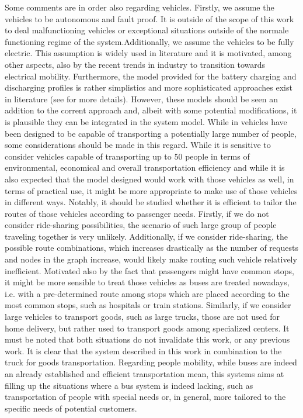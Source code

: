 Some comments are in order also regarding vehicles. Firstly, we assume the vehicles to be autonomous and fault proof. It is outside of the scope of this work to deal malfunctioning vehicles or exceptional situations outside of the normale functioning regime of the system.Additionally, we assume the vehicles to be fully electric. This assumption is widely used in literature and it is motivated, among other aspects, also by the recent trends in industry to transition towards electrical mobility. Furthermore, the model provided for the battery charging and discharging profiles is rather simplistics and more sophisticated approaches exist in literature (see  for more details). However, these models should be seen an addition to the corrent approach and, albeit with some potential modifications, it is plausible they can be integrated in the system model. While in \cite{project_thesis} vehicles have been designed to be capable of transporting a potentially large number of people, some considerations should be made in this regard. While it is sensitive to consider vehicles capable of transporting up to 50 people in terms of environmental, economical and overall transportation efficiency and while it is also expected that the model designed would work with those vehicles as well, in terms of practical use, it might be more appropriate to make use of those vehicles in different ways. Notably, it should be studied whether it is efficient to tailor the routes of those vehicles according to passenger needs. Firstly, if we do not consider ride-sharing possibilities, the scenario of such large group of people traveling together is very unlikely. Additionally, if we consider ride-sharing, the possible route combinations, which increases drastically as the number of requests and nodes in the graph increase, would likely make routing such vehicle relatively inefficient. Motivated also by the fact that passengers might have common stops, it might be more sensible to treat those vehicles as buses are treated nowadays, i.e. with a pre-determined route among stops which are placed according to the most common stops, such as hospitals or train stations. Similarly, if we consider large vehicles to transport goods, such as large trucks, those are not used for home delivery, but rather used to transport goods among specialized centers. It must be noted that both situations do not invalidate this work, or any previous work. It is clear that the system described in this work in combination to the truck for goods transportation. Regarding people mobility, while buses are indeed an already established and efficient transportation mean, this systems aims at filling up the situations where a bus system is indeed lacking, such as transportation of people with special needs or, in general, more tailored to the specific needs of potential customers. \\
